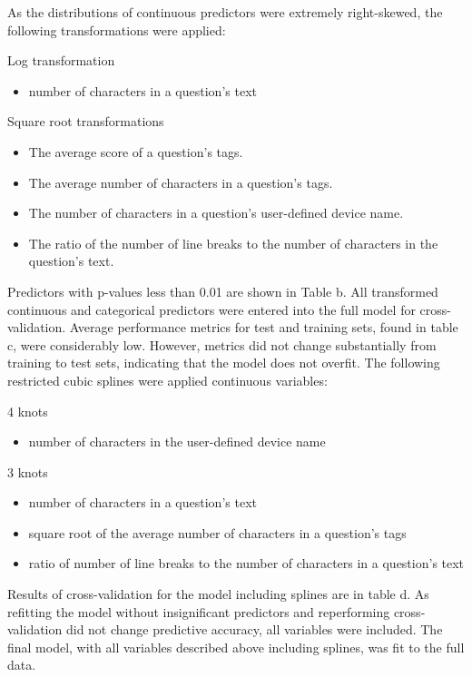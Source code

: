 \documentclass{article}
\begin{document}
As the distributions of continuous predictors were extremely right-skewed, the following transformations were applied: 

Log transformation
\begin{itemize}
  \item number of characters in a question's text
\end{itemize}

Square root transformations
\begin{itemize}
  \item The average score of a question's tags.
  \item The average number of characters in a question's tags.
  \item The number of characters in a question's user-defined device name.
  \item The ratio of the number of line breaks to the number of characters in the question's text.
\end{itemize}

Predictors with p-values less than 0.01 are shown in Table b. All transformed continuous and categorical predictors were entered into the full model for cross-validation. Average performance metrics for test and training sets, found in table c, were considerably low. However, metrics did not change substantially from training to test sets, indicating that the model does not overfit. The following restricted cubic splines were applied continuous variables:

4 knots
\begin{itemize}
  \item number of characters in the user-defined device name
\end{itemize}

3 knots
\begin{itemize}
  \item number of characters in a question's text
  \item square root of the average number of characters in a question's tags
  \item ratio of number of line breaks to the number of characters in a question's text
\end{itemize}

Results of cross-validation for the model including splines are in table d. As refitting the model without insignificant predictors and reperforming cross-validation did not change predictive accuracy, all variables were included. The final model, with all variables described above including splines, was fit to the full data.  
\end{document}
